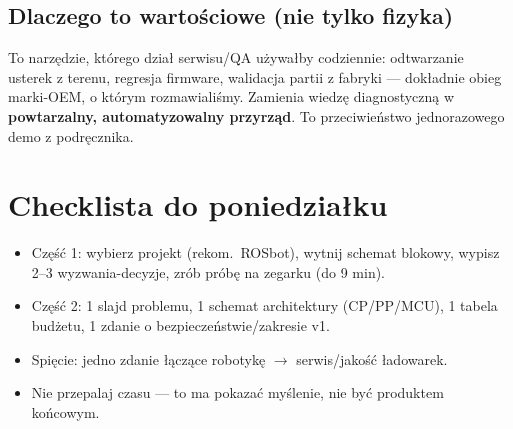 \documentclass[11pt]{article}
\newcommand{\ra}{$\rightarrow$}
\begin{document}
\subsection{Dlaczego to wartościowe (nie tylko fizyka)}

To narzędzie, którego dział serwisu/QA używałby codziennie: odtwarzanie usterek z terenu, regresja firmware, walidacja partii z fabryki --- dokładnie obieg marki-OEM, o którym rozmawialiśmy. Zamienia wiedzę diagnostyczną w \textbf{powtarzalny, automatyzowalny przyrząd}. To przeciwieństwo jednorazowego demo z podręcznika.

\section{Checklista do poniedziałku}

\begin{itemize}[label=$\square$]
  \item Część 1: wybierz projekt (rekom.\ ROSbot), wytnij schemat blokowy, wypisz 2--3 wyzwania-decyzje, zrób próbę na zegarku (do 9 min).
  \item Część 2: 1 slajd problemu, 1 schemat architektury (CP/PP/MCU), 1 tabela budżetu, 1 zdanie o bezpieczeństwie/zakresie v1.
  \item Spięcie: jedno zdanie łączące robotykę \ra{} serwis/jakość ładowarek.
  \item Nie przepalaj czasu --- to ma pokazać myślenie, nie być produktem końcowym.
\end{itemize}
\end{document}
